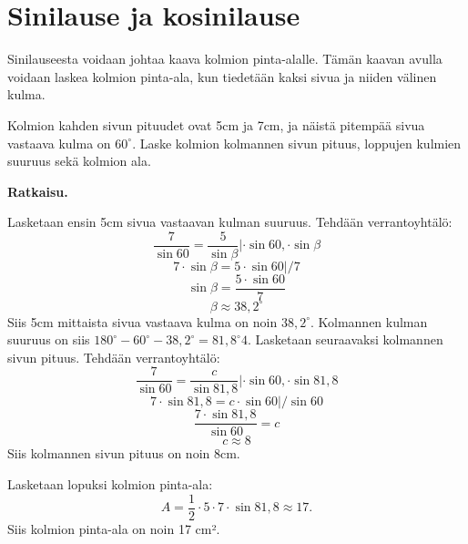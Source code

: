 \section*{Sinilause ja kosinilause}


Sinilauseesta voidaan johtaa kaava kolmion pinta-alalle. Tämän kaavan avulla voidaan laskea kolmion pinta-ala, kun tiedetään kaksi sivua ja niiden välinen kulma.


\begin{esimerkki}
Kolmion kahden sivun pituudet ovat 5cm ja 7cm, ja näistä pitempää sivua vastaava kulma on $60^\circ$. Laske kolmion kolmannen sivun pituus, loppujen kulmien suuruus sekä kolmion ala.

\textbf{Ratkaisu.}

Lasketaan ensin 5cm sivua vastaavan kulman suuruus. Tehdään verrantoyhtälö:
$$\frac{7}{\sin 60} = \frac{5}{\sin \beta} | \cdot \sin 60, \cdot \sin \beta$$
$$7 \cdot \sin \beta = 5 \cdot \sin 60 | / 7$$
$$\sin \beta = \frac{5 \cdot \sin 60}{7}$$
$$\beta \approx 38,2^\circ$$
Siis 5cm mittaista sivua vastaava kulma on noin $38,2^\circ$. Kolmannen kulman suuruus on siis $180^\circ - 60^\circ -38,2^\circ = 81,8^\circ4$.
Lasketaan seuraavaksi kolmannen sivun pituus. Tehdään verrantoyhtälö:
$$\frac{7}{\sin 60} = \frac{c}{\sin 81,8}| \cdot \sin 60, \cdot \sin 81,8$$
$$7 \cdot \sin 81,8 = c \cdot \sin 60 | / \sin 60$$
$$\frac{7 \cdot \sin 81,8}{\sin 60} = c$$
$$c \approx 8$$
Siis kolmannen sivun pituus on noin 8cm.

Lasketaan lopuksi kolmion pinta-ala:
$$A = \frac{1}{2} \cdot 5 \cdot 7 \cdot \sin 81,8 \approx 17.$$
Siis kolmion pinta-ala on noin 17 cm².
\end{esimerkki}